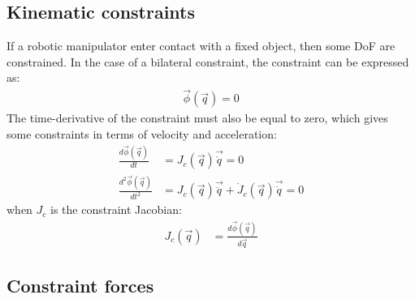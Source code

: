 \subsection{Kinematic constraints}
\label{sec:constraints}
%
If a robotic manipulator enter contact with a fixed object, then some DoF are constrained. In the case of a bilateral constraint, the constraint can be expressed as:
\begin{align}
\vec{\phi}( \vec{ q } ) = 0
\label{eq:constraint}
\end{align}
%
The time-derivative of the constraint must also be equal to zero, which gives some constraints in terms of velocity and acceleration:
\begin{align}
\frac{d \vec{\phi}( \vec{ q } ) }{dt}     &= J_c( \vec{ q } ) \vec{\dot{q}}  = 0 \\
\frac{d^2 \vec{\phi}( \vec{ q } ) }{dt^2} &= J_c( \vec{ q } ) \vec{\ddot{q}}  + \dot{J}_c( \vec{ q } ) \vec{\dot{q}} = 0 
\label{eq:constraint_diff}
\end{align}
%
when $J_c$ is the constraint Jacobian:
%
\begin{align}
J_c( \vec{ q } )                    &= \frac{d \vec{\phi}( \vec{ q } ) }{d\vec{ q }}
\label{eq:constraint_jaco}
\end{align}

\subsection{Constraint forces}
\label{sec:constraint_forces}

